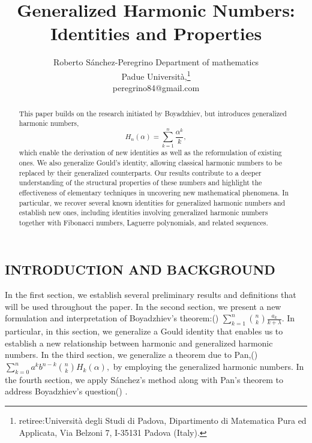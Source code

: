 \documentclass[a4paper,10pt,oneside]{article}
\newcommand{\cl}[1]{\begin{center}{#1}\end{center}}
\theoremstyle{definition}
\theoremstyle{remark}
\begin{document}
\title{Generalized Harmonic Numbers: Identities and Properties}

 \author{Roberto S\'anchez-Peregrino Department of mathematics \\  Padue Università,\thanks{retiree:Universit\`a degli Studi di Padova, Dipartimento di Matematica Pura ed Applicata, Via Belzoni 7, I-35131 Padova (Italy).}\\ peregrino84@gmail.com   }
  \date{}

  

\maketitle
\begin{abstract}
This paper builds on the research initiated by Boyadzhiev, but introduces generalized harmonic numbers,
\[
H_n(\alpha)= \sum_{k=1}^n \frac{\alpha^{k}}{k},
\]
which enable the derivation of new identities as well as the reformulation of existing ones. We also generalize Gould's identity, allowing classical harmonic numbers to be replaced by their generalized counterparts. Our results contribute to a deeper understanding of the structural properties of these numbers and highlight the effectiveness of elementary techniques in uncovering new mathematical phenomena. In particular, we recover several known identities for generalized harmonic numbers and establish new ones, including identities involving generalized harmonic numbers together with Fibonacci numbers, Laguerre polynomials, and related sequences.
\end{abstract}

 



 \cl{\section{INTRODUCTION AND BACKGROUND}}
 In the first section, we establish several preliminary results and definitions that will be used throughout the paper.
In the second section, we present a new formulation and interpretation of Boyadzhiev's theorem:(\cite{khristo})
$\sum_{k=1}^n \binom{n}{k} \frac{a_k}{k+\lambda}.$ In particular, in this section, we generalize a Gould identity that enables us to establish a new relationship between harmonic and generalized harmonic numbers.
In the third section, we generalize a theorem due to Pan,(\cite{pan})
$\sum_{k=0}^n a^k b^{n-k} \binom{n}{k} H_k(\alpha),$ by employing the generalized harmonic numbers.
In the fourth section, we apply Sánchez's method along with Pan's theorem to address Boyadzhiev's question(\cite{khristo3}) .\par
\end{document}
